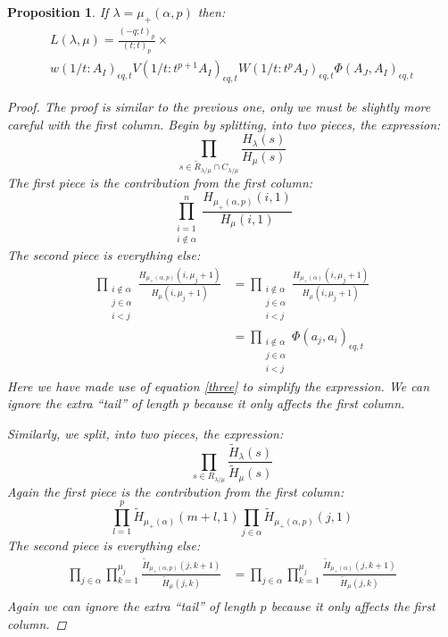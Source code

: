 \documentclass[12pt,dvips]{amsart}
\newtheorem{proposition}{Proposition}[section]
\begin{document}
\bigskip\bigskip
\begin{proposition} \label{LHS}
If $\lambda = \mu_+(\alpha,p)$ then:
\begin{multline*}
L(\lambda,\mu) = \frac{(-q;t)_p}{(t;t)_p} \times \\
w(1/t : A_I)_{\epsilon q, t} V(1/t : t^{p+1} A_I)_{\epsilon q, t} W(1/t : t^p A_J)_{\epsilon q, t} \Phi(A_J,A_I)_{\epsilon q, t} 
\end{multline*}
\begin{proof}
The proof is similar to the previous one, only we must be slightly more careful with the first column. Begin by splitting, into two pieces, the expression:
$$ \prod_{s \in \tilde{R}_{\lambda / \mu} \cap C_{\lambda / \mu}} \frac{H_\lambda(s)}{H_\mu(s)} $$
The first piece is the contribution from the first column:
$$\prod_{\substack{i = 1 \\ i \not\in \alpha}}^n \frac{H_{\mu_+(\alpha,p)}(i,1)}{H_\mu(i,1)} $$
The second piece is everything else:
\begin{align*}
\prod_{\substack{ i \not\in \alpha \\ j \in \alpha \\ i < j }} \frac{H_{\mu_+(\alpha,p)}(i,\mu_j +1)}{H_\mu(i,\mu_j + 1)} 
&= \prod_{\substack{ i \not\in \alpha \\ j \in \alpha \\ i < j }} \frac{H_{\mu_+(\alpha)}(i,\mu_j +1)}{H_\mu(i,\mu_j + 1)} \\
&= \prod_{\substack{ i \not\in \alpha \\ j \in \alpha \\ i < j }} \Phi(a_j,a_i)_{\epsilon q, t} 
\end{align*}
Here we have made use of equation \eqref{three} to simplify the expression. We can ignore the extra ``tail'' of length $p$ because it only affects the first column.

\medskip
\noindent
Similarly, we split, into two pieces, the expression:
$$ \prod_{s \in R_{\lambda / \mu}} \frac{\tilde{H}_\lambda(s)}{\tilde{H}_\mu(s)} $$
Again the first piece is the contribution from the first column:
$$ \prod_{l=1}^p \tilde{H}_{\mu_+(\alpha)}(m+l,1) \prod_{j \in \alpha} \tilde{H}_{\mu_+(\alpha,p)}(j,1) $$
The second piece is everything else:
\begin{align*}
\prod_{j \in \alpha}  \prod_{k=1}^{\mu_j} \frac{\tilde{H}_{\mu_+(\alpha,p)}(j,k+1)}{\tilde{H}_\mu(j,k)} 
&= \prod_{j \in \alpha}  \prod_{k=1}^{\mu_j} \frac{\tilde{H}_{\mu_+(\alpha)}(j,k+1)}{\tilde{H}_\mu(j,k)} \\
\end{align*}
Again we can ignore the extra ``tail'' of length $p$ because it only affects the first column.



\end{proof}
\end{proposition}
\end{document}
